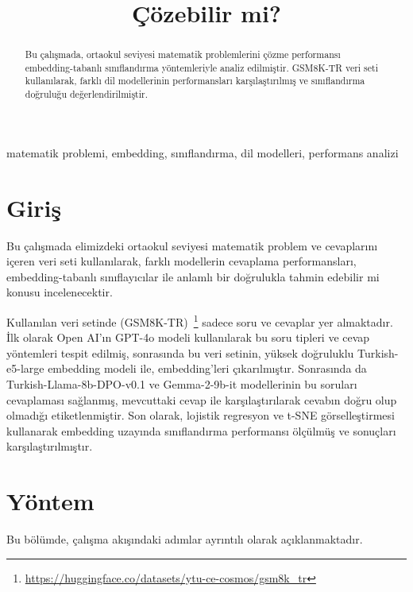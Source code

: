 \documentclass[conference]{IEEEtran}
\begin{document}
\title{Çözebilir mi?}

\author{
}

\maketitle

\begin{abstract}
Bu çalışmada, ortaokul seviyesi matematik problemlerini çözme performansı embedding-tabanlı sınıflandırma yöntemleriyle analiz edilmiştir. GSM8K-TR veri seti kullanılarak, farklı dil modellerinin performansları karşılaştırılmış ve sınıflandırma doğruluğu değerlendirilmiştir.
\end{abstract}

\begin{IEEEkeywords}
matematik problemi, embedding, sınıflandırma, dil modelleri, performans analizi
\end{IEEEkeywords}

\section{Giriş}

Bu çalışmada elimizdeki ortaokul seviyesi matematik problem ve cevaplarını içeren veri seti kullanılarak, farklı modellerin cevaplama performansları, embedding-tabanlı sınıflayıcılar ile anlamlı bir doğrulukla tahmin edebilir mi konusu incelenecektir.

Kullanılan veri setinde (GSM8K-TR)~\footnote{\url{https://huggingface.co/datasets/ytu-ce-cosmos/gsm8k_tr}} sadece soru ve cevaplar yer almaktadır. İlk olarak Open AI'ın GPT-4o modeli kullanılarak bu soru tipleri ve cevap yöntemleri tespit edilmiş, sonrasında bu veri setinin, yüksek doğruluklu Turkish-e5-large embedding modeli ile, embedding'leri çıkarılmıştır. Sonrasında da Turkish-Llama-8b-DPO-v0.1 ve Gemma-2-9b-it modellerinin bu soruları cevaplaması sağlanmış, mevcuttaki cevap ile karşılaştırılarak cevabın doğru olup olmadığı etiketlenmiştir. Son olarak, lojistik regresyon ve t-SNE görselleştirmesi kullanarak embedding uzayında sınıflandırma performansı ölçülmüş ve sonuçları karşılaştırılmıştır. 

\section{Yöntem}
Bu bölümde, çalışma akışındaki adımlar ayrıntılı olarak açıklanmaktadır.
\end{document}
